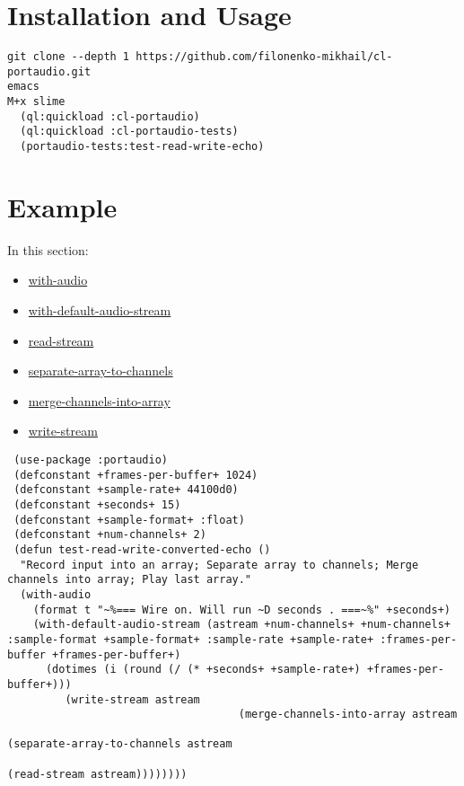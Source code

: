 \documentclass[a4paper]{report}
\begin{document}
\section{Installation and Usage} \label{d0d0e0e0e0e0}\begin{verbatim}
git clone --depth 1 https://github.com/filonenko-mikhail/cl-portaudio.git
emacs
M+x slime
  (ql:quickload :cl-portaudio)
  (ql:quickload :cl-portaudio-tests)
  (portaudio-tests:test-read-write-echo)\end{verbatim}\section{Example} \label{d0d0e0e0e0e1}
      In this section:
      \begin{itemize}
      
	\item
	\hyperref[portaudio__fun__with-audio]{with-audio}
	    
	\item
	\hyperref[portaudio__fun__with-default-audio-stream]{with-default-audio-stream}
	    
	\item
	\hyperref[portaudio__fun__read-stream]{read-stream}
	    
	\item
	\hyperref[portaudio__fun__separate-array-to-channels]{separate-array-to-channels}
	    
	\item
	\hyperref[portaudio__fun__merge-channels-into-array]{merge-channels-into-array}
	    
	\item
	\hyperref[portaudio__fun__write-stream]{write-stream}
	    
      \end{itemize}
    \begin{verbatim}
 (use-package :portaudio)
 (defconstant +frames-per-buffer+ 1024)
 (defconstant +sample-rate+ 44100d0)
 (defconstant +seconds+ 15)
 (defconstant +sample-format+ :float)
 (defconstant +num-channels+ 2)
 (defun test-read-write-converted-echo ()
  "Record input into an array; Separate array to channels; Merge channels into array; Play last array." 
  (with-audio
    (format t "~%=== Wire on. Will run ~D seconds . ===~%" +seconds+) 
    (with-default-audio-stream (astream +num-channels+ +num-channels+ :sample-format +sample-format+ :sample-rate +sample-rate+ :frames-per-buffer +frames-per-buffer+) 
      (dotimes (i (round (/ (* +seconds+ +sample-rate+) +frames-per-buffer+)))
         (write-stream astream
                                    (merge-channels-into-array astream
                                                               (separate-array-to-channels astream
                                                                                           (read-stream astream))))))))\end{verbatim}
\end{document}
